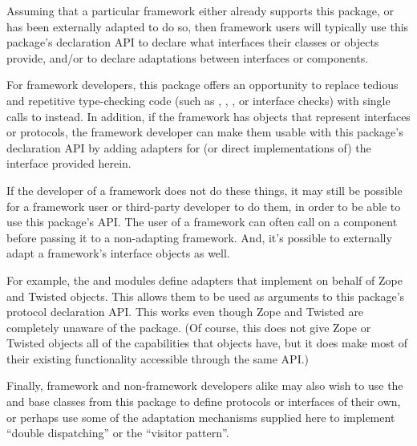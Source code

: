 Assuming that a particular framework either already supports this package, or
has been externally adapted to do so, then framework users will typically
use this package's declaration API to declare what interfaces their classes or
objects provide, and/or to declare adaptations between interfaces or
components.

For framework developers, this package offers an opportunity to replace
tedious and repetitive type-checking code (such as ,
, , or interface checks) with single
calls to  instead.  In addition, if the framework has
objects that represent interfaces or protocols, the framework developer can
make them usable with this package's declaration API by adding adapters for
(or direct implementations of) the  interface provided
herein.

If the developer of a framework does not do these things, it may still be
possible for a framework user or third-party developer to do them, in order to
be able to use this package's API.  The user of a framework can often call
 on a component before passing it to a non-adapting
framework.  And, it's possible to externally adapt a
framework's interface objects as well.

For example, the  and
 modules define adapters that
implement  on behalf of Zope and Twisted 
objects.  This allows them to be used as arguments to this package's protocol
declaration API.  This works even though Zope and Twisted are completely unaware
of the  package.  (Of course, this does not give Zope or
Twisted  objects all of the capabilities that 
objects have, but it does make most of their existing functionality accessible
through the same API.)

Finally, framework and non-framework developers alike may also wish to use the
 and  base classes from this package to
define protocols or interfaces of their own, or perhaps use some of the
adaptation mechanisms supplied here to implement ``double dispatching'' or
the ``visitor pattern''.


